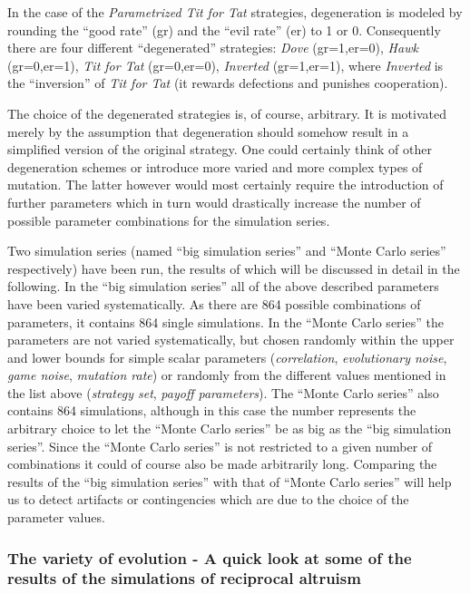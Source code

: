 \begin{enumerate}
  In the case of the {\em Parametrized Tit for Tat} strategies, degeneration
  is modeled by rounding the ``good rate'' (gr) and the ``evil rate'' (er) to
  1 or 0. Consequently there are four different ``degenerated'' strategies:
  {\em Dove} (gr=1,er=0), {\em Hawk} (gr=0,er=1), {\em Tit for Tat}
  (gr=0,er=0), {\em Inverted} (gr=1,er=1), where {\em Inverted} is the
  ``inversion'' of {\em Tit for Tat} (it rewards defections and punishes
  cooperation).

  The choice of the degenerated strategies is, of course, arbitrary.  It is
  motivated merely by the assumption that degeneration should somehow result
  in a simplified version of the original strategy. One could certainly think
  of other degeneration schemes or introduce more varied and more complex
  types of mutation. The latter however would most certainly require the
  introduction of further parameters which in turn would drastically increase
  the number of possible parameter combinations for the simulation series.

\end{enumerate}

Two simulation series (named ``big simulation series'' and ``Monte Carlo
series'' respectively) have been run, the results of which will be discussed
in detail in the following. In the ``big simulation series'' all of the above
described parameters have been varied systematically. As there are 864
possible combinations of parameters, it contains 864 single simulations. In
the ``Monte Carlo series'' the parameters are not varied systematically, but
chosen randomly within the upper and lower bounds for simple scalar parameters
({\em correlation}, {\em evolutionary noise}, {\em game noise}, {\em mutation
  rate}) or randomly from the different values mentioned in the list above
({\em strategy set}, {\em payoff parameters}). The ``Monte Carlo series'' also
contains 864 simulations, although in this case the number represents the
arbitrary choice to let the ``Monte Carlo series'' be as big as the ``big
simulation series''. Since the ``Monte Carlo series'' is not restricted to a
given number of combinations it could of course also be made arbitrarily long.
Comparing the results of the ``big simulation series'' with that of ``Monte
Carlo series'' will help us to detect artifacts or contingencies which are due
to the choice of the parameter values.

\subsubsection{The variety of evolution - A quick look at some of the results
of the simulations of reciprocal altruism}

